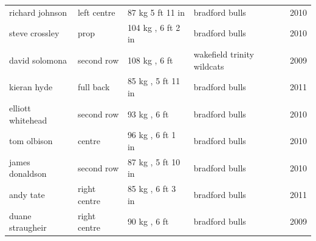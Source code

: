\documentclass{article}
\begin{document}
\begin{tabular}{lllll}
richard johnson & left centre & 87 kg 5 ft 11 in & bradford bulls & 2010 \\
steve crossley & prop & 104 kg , 6 ft 2 in & bradford bulls & 2010 \\
david solomona & second row & 108 kg , 6 ft & wakefield trinity wildcats & 2009 \\
kieran hyde & full back & 85 kg , 5 ft 11 in & bradford bulls & 2011 \\
elliott whitehead & second row & 93 kg , 6 ft & bradford bulls & 2010 \\
tom olbison & centre & 96 kg , 6 ft 1 in & bradford bulls & 2010 \\
james donaldson & second row & 87 kg , 5 ft 10 in & bradford bulls & 2010 \\
andy tate & right centre & 85 kg , 6 ft 3 in & bradford bulls & 2011 \\
duane straugheir & right centre & 90 kg , 6 ft & bradford bulls & 2009 \\
\bottomrule
\end{tabular}
\end{document}
